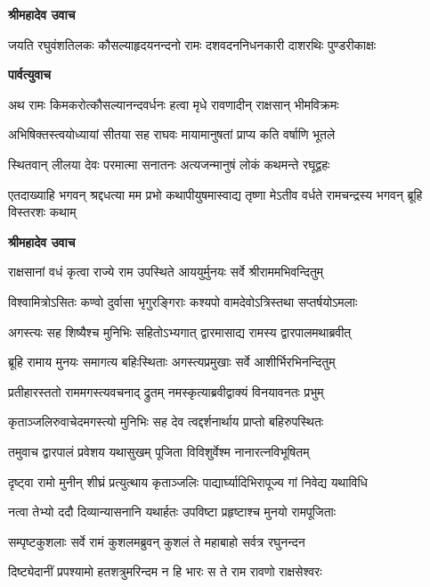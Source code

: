 




\textbf{श्रीमहादेव उवाच}

\twolineshloka
{जयति रघुवंशतिलकः कौसल्याहृदयनन्दनो रामः}
{दशवदननिधनकारी दाशरथिः पुण्डरीकाक्षः} %

\textbf{पार्वत्युवाच}

\twolineshloka
{अथ रामः किमकरोत्कौसल्यानन्दवर्धनः}
{हत्वा मृधे रावणादीन् राक्षसान् भीमविक्रमः} %

\twolineshloka
{अभिषिक्तस्त्वयोध्यायां सीतया सह राघवः}
{मायामानुषतां प्राप्य कति वर्षाणि भूतले} %

\twolineshloka
{स्थितवान् लीलया देवः परमात्मा सनातनः}
{अत्यजन्मानुषं लोकं कथमन्ते रघूद्वहः} %

\threelineshloka
{एतदाख्याहि भगवन् श्रद्दधत्या मम प्रभो}
{कथापीयुषमास्वाद्य तृष्णा मेऽतीव वर्धते}
{रामचन्द्रस्य भगवन् ब्रूहि विस्तरशः कथाम्} %

\textbf{श्रीमहादेव उवाच}

\twolineshloka
{राक्षसानां वधं कृत्वा राज्ये राम उपस्थिते}
{आययुर्मुनयः सर्वे श्रीराममभिवन्दितुम्} %

\twolineshloka
{विश्वामित्रोऽसितः कण्वो दुर्वासा भृगुरङ्गिराः}
{कश्यपो वामदेवोऽत्रिस्तथा सप्तर्षयोऽमलाः} %

\twolineshloka
{अगस्त्यः सह शिष्यैश्च मुनिभिः सहितोऽभ्यगात्}
{द्वारमासाद्य रामस्य द्वारपालमथाब्रवीत्} %

\twolineshloka
{ब्रूहि रामाय मुनयः समागत्य बहिःस्थिताः}
{अगस्त्यप्रमुखाः सर्वे आशीर्भिरभिनन्दितुम्} %

\twolineshloka
{प्रतीहारस्ततो राममगस्त्यवचनाद् द्रुतम्}
{नमस्कृत्याब्रवीद्वाक्यं विनयावनतः प्रभुम्} %

\twolineshloka
{कृताञ्जलिरुवाचेदमगस्त्यो मुनिभिः सह}
{देव त्वद्दर्शनार्थाय प्राप्तो बहिरुपस्थितः} %

\twolineshloka
{तमुवाच द्वारपालं प्रवेशय यथासुखम्}
{पूजिता विविशुर्वेश्म नानारत्नविभूषितम्} %

\twolineshloka
{दृष्ट्वा रामो मुनीन् शीघ्रं प्रत्युत्थाय कृताञ्जलिः}
{पाद्यार्घ्यादिभिरापूज्य गां निवेद्य यथाविधि} %

\twolineshloka
{नत्वा तेभ्यो ददौ दिव्यान्यासनानि यथार्हतः}
{उपविष्टा प्रहृष्टाश्च मुनयो रामपूजिताः} %

\twolineshloka
{सम्पृष्टकुशलाः सर्वे रामं कुशलमब्रुवन्}
{कुशलं ते महाबाहो सर्वत्र रघुनन्दन} %

\twolineshloka
{दिष्ट्येदानीं प्रपश्यामो हतशत्रुमरिन्दम}
{न हि भारः स ते राम रावणो राक्षसेश्वरः} %

